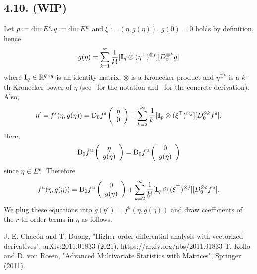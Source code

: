 \documentclass[a4paper,11pt,fleqn]{article}
\begin{document}
\subsection{4.10. (WIP)}
Let $p:= {\rm dim}E^{\rm s}, q:= {\rm dim}E^{\rm u}$ and $\xi:=(\eta,g(\eta))$. $g(0)=0$ holds by definition, hence  
\begin{equation}
    g(\eta) = \sum_{k=1}^\infty{\frac{1}{k!}[{\bf I}_q \otimes (\eta^\top)^{\otimes j}] [D_0^{\otimes k}g] }
\end{equation} 
where ${\bf I}_q \in \mathbb{R}^{q\times q}$ is an identity matrix, $\otimes$ is a Kronecker product and $\eta^{\otimes k}$ is a $k$-th Kronecker power of $\eta$ (see~\cite{Chacon} for the notation and~\cite[Th~1.4.8]{Kollo} for the concrete derivation). Also, 
\begin{align}
    \eta' = f^s(\eta,g(\eta)) = {\rm D}_0f^s \left(\begin{array}{c}
        \eta \\
        0
    \end{array}\right)
    + \sum_{k=2}^\infty{\frac{1}{k!}[{\bf I}_p \otimes (\xi^\top)^{\otimes j}] [D_0^{\otimes k}f^s] }.
\end{align}
Here, 
\begin{equation}
    {\rm D}_0f^u \left(\begin{array}{c}
        \eta \\
        g(\eta)
    \end{array}\right)
    = {\rm D}_0f^u \left(\begin{array}{c}
        0 \\
        g(\eta)
    \end{array}\right)
\end{equation}
since $\eta \in E^{\rm s}$. Therefore
\begin{align}
    f^u(\eta,g(\eta)) = {\rm D}_0f^u \left(\begin{array}{c}
        0 \\
        g(\eta)
    \end{array}\right)
    + \sum_{k=2}^\infty{\frac{1}{k!}[{\bf I}_q \otimes (\xi^\top)^{\otimes j}] [D_0^{\otimes k}f^u] }.
\end{align}
We plug these equations into $g(\eta') = f^u(\eta,g(\eta))$ and draw coefficients of the $r$-th order terms in $\eta$ as follows.  

\begin{thebibliography}{99}
     J. E. Chac\'{o}n and T. Duong, "Higher order differential analysis with vectorized derivatives", arXiv:2011.01833 (2021). https://arxiv.org/abs/2011.01833    
     T. Kollo and D. von Rosen, "Advanced Multivariate Statistics with Matrices", Springer (2011). 
\end{thebibliography}
\end{document}
